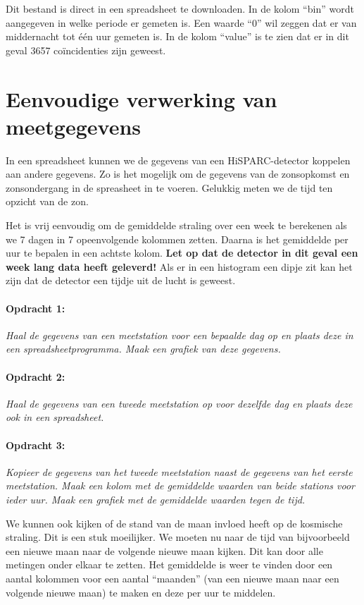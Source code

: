 Dit bestand is direct in een spreadsheet te downloaden. In de kolom
``bin'' wordt aangegeven in welke periode er gemeten is. Een waarde
``0'' wil zeggen dat er van middernacht tot één uur gemeten is.
In de kolom ``value'' is te zien dat er in dit geval 3657 coïncidenties
zijn geweest.


\section{Eenvoudige verwerking van meetgegevens}

In een spreadsheet kunnen we de gegevens van een HiSPARC-detector
koppelen aan andere gegevens. Zo is het mogelijk om de gegevens van
de zonsopkomst en zonsondergang in de spreasheet in te voeren. Gelukkig
meten we de tijd ten opzicht van de zon.

Het is vrij eenvoudig om de gemiddelde straling over een week te berekenen
als we 7 dagen in 7 opeenvolgende kolommen zetten. Daarna is het gemiddelde
per uur te bepalen in een achtste kolom. \textbf{Let op dat de detector
in dit geval een week lang data heeft geleverd!} Als er in een histogram
een dipje zit kan het zijn dat de detector een tijdje uit de lucht
is geweest.


\paragraph*{Opdracht 1:}

\emph{Haal de gegevens van een meetstation voor een bepaalde dag op
en plaats deze in een spreadsheetprogramma. Maak een grafiek van deze
gegevens.}


\paragraph*{Opdracht 2:}

\emph{Haal de gegevens van een tweede meetstation op voor dezelfde
dag en plaats deze ook in een spreadsheet.}


\paragraph*{Opdracht 3:}

\emph{Kopieer de gegevens van het tweede meetstation naast de gegevens
van het eerste meetstation. Maak een kolom met de gemiddelde waarden
van beide stations voor ieder uur. Maak een grafiek met de gemiddelde
waarden tegen de tijd.}

We kunnen ook kijken of de stand van de maan invloed heeft op de kosmische
straling. Dit is een stuk moeilijker. We moeten nu naar de tijd van
bijvoorbeeld een nieuwe maan naar de volgende nieuwe maan kijken.
Dit kan door alle metingen onder elkaar te zetten. Het gemiddelde
is weer te vinden door een aantal kolommen voor een aantal ``maanden''
(van een nieuwe maan naar een volgende nieuwe maan) te maken en deze
per uur te middelen.


